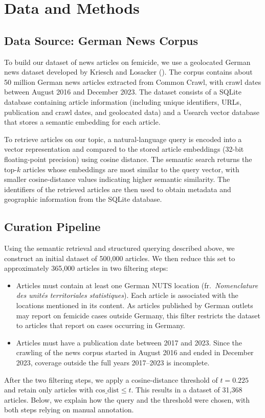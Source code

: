 \documentclass{article}
\begin{document}
\section{Data and Methods}\label{sec:methods}

\subsection{Data Source: German News Corpus}
\label{sec:datasource}
To build our dataset of news articles on femicide, we use a geolocated German news dataset developed by Kriesch and Losacker (\citeyear{kreischlosacker2025geolocated}). The corpus contains about 50 million German news articles extracted from Common Crawl, with crawl dates between August 2016 and December 2023. The dataset consists of a SQLite database containing article information (including unique identifiers, URLs, publication and crawl dates, and geolocated data) and a Usearch vector database that stores a semantic embedding for each article.
 
To retrieve articles on our topic, a natural-language query is encoded into a vector representation and compared to the stored article embeddings (32-bit floating-point precision) using cosine distance. The semantic search returns the top-$k$ articles whose embeddings are most similar to the query vector, with smaller cosine-distance values indicating higher semantic similarity. The identifiers of the retrieved articles are then used to obtain metadata and geographic information from the SQLite database.

\subsection{Curation Pipeline}
\label{sec:pipeline}
Using the semantic retrieval and structured querying described above, we construct an initial dataset of 500{,}000 articles. We then reduce this set to approximately 365{,}000 articles in two filtering steps:
\begin{itemize}[label=--, leftmargin=1.4em, topsep=0pt, partopsep=0pt, itemsep=1pt, parsep=0pt]
  \item Articles must contain at least one German NUTS location (fr.\ \emph{Nomenclature des unités territoriales statistiques}). Each article is associated with the locations mentioned in its content. As articles published by German outlets may report on femicide cases outside Germany, this filter restricts the dataset to articles that report on cases occurring in Germany.
  \item Articles must have a publication date between 2017 and 2023. Since the crawling of the news corpus started in August 2016 and ended in December 2023, coverage outside the full years 2017--2023 is incomplete. 
\end{itemize}
After the two filtering steps, we apply a cosine-distance threshold of $t = 0.225$ and retain only articles with $\mathrm{cos\_dist} \le t$. This results in a dataset of 31{,}368 articles. Below, we explain how the query and the threshold were chosen, with both steps relying on manual annotation.
\end{document}
